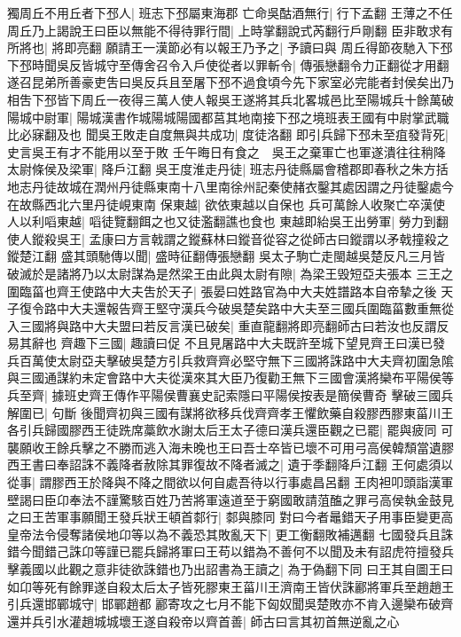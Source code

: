 獨周丘不用丘者下邳人|{
	班志下邳屬東海郡}
亡命吳酤酒無行|{
	行下孟翻}
王薄之不任周丘乃上謁說王曰臣以無能不得待罪行間|{
	上時掌翻說式芮翻行戶剛翻}
臣非敢求有所將也|{
	將即亮翻}
願請王一漢節必有以報王乃予之|{
	予讀曰與}
周丘得節夜馳入下邳下邳時聞吳反皆城守至傳舍召令入戶使從者以罪斬令|{
	傳張戀翻令力正翻從才用翻}
遂召昆弟所善豪吏吿曰吳反兵且至屠下邳不過食頃今先下家室必完能者封侯矣出乃相吿下邳皆下周丘一夜得三萬人使人報吳王遂將其兵北畧城邑比至陽城兵十餘萬破陽城中尉軍|{
	陽城漢書作城陽城陽國都莒其地南接下邳之境班表王國有中尉掌武職比必寐翻及也}
聞吳王敗走自度無與共成功|{
	度徒洛翻}
即引兵歸下邳未至疽發背死|{
	史言吳王有才不能用以至于敗}
壬午晦日有食之　吳王之棄軍亡也軍遂潰往往稍降太尉條侯及梁軍|{
	降戶江翻}
吳王度淮走丹徒|{
	班志丹徒縣屬會稽郡即春秋之朱方括地志丹徒故城在潤州丹徒縣東南十八里南徐州記秦使赭衣鑿其處因謂之丹徒鑿處今在故縣西北六里丹徒峴東南}
保東越|{
	欲依東越以自保也}
兵可萬餘人收聚亡卒漢使人以利㗖東越|{
	㗖徒覽翻餌之也又徒濫翻譙也食也}
東越即紿吳王出勞軍|{
	勞力到翻}
使人鏦殺吳王|{
	孟康曰方言戟謂之鏦蘇林曰鏦音從容之從師古曰鏦謂以矛戟撞殺之鏦楚江翻}
盛其頭馳傳以聞|{
	盛時征翻傳張戀翻}
吳太子駒亡走閩越吳楚反凡三月皆破滅於是諸將乃以太尉謀為是然梁王由此與太尉有隙|{
	為梁王毁短亞夫張本}
三王之圍臨菑也齊王使路中大夫吿於天子|{
	張晏曰姓路官為中大夫姓譜路本自帝摯之後}
天子復令路中大夫還報告齊王堅守漢兵今破吳楚矣路中大夫至三國兵圍臨菑數重無從入三國將與路中大夫盟曰若反言漢已破矣|{
	重直龍翻將即亮翻師古曰若汝也反謂反易其辭也}
齊趣下三國|{
	趣讀曰促}
不且見屠路中大夫既許至城下望見齊王曰漢已發兵百萬使太尉亞夫擊破吳楚方引兵救齊齊必堅守無下三國將誅路中大夫齊初圍急隂與三國通謀約未定會路中大夫從漢來其大臣乃復勸王無下三國會漢將欒布平陽侯等兵至齊|{
	據班史齊王傳作平陽侯曹襄史記索隱曰平陽侯按表是簡侯曹奇}
擊破三國兵解圍已|{
	句斷}
後聞齊初與三國有謀將欲移兵伐齊齊孝王懼飲藥自殺膠西膠東菑川王各引兵歸國膠西王徒跣席藁飲水謝太后王太子德曰漢兵還臣觀之已罷|{
	罷與疲同}
可襲願收王餘兵擊之不勝而逃入海未晚也王曰吾士卒皆已壞不可用弓高侯韓頹當遺膠西王書曰奉詔誅不義降者赦除其罪復故不降者滅之|{
	遺于季翻降戶江翻}
王何處須以從事|{
	謂膠西王於降與不降之間欲以何自處吾待以行事處昌呂翻}
王肉袒叩頭詣漢軍壁謁曰臣卬奉法不謹驚駭百姓乃苦將軍遠道至于窮國敢請菹醢之罪弓高侯執金鼓見之曰王苦軍事願聞王發兵狀王頓首䣛行|{
	䣛與膝同}
對曰今者鼂錯天子用事臣變更高皇帝法令侵奪諸侯地卬等以為不義恐其敗亂天下|{
	更工衡翻敗補邁翻}
七國發兵且誅錯今聞錯己誅卬等謹已罷兵歸將軍曰王苟以錯為不善何不以聞及未有詔虎符擅發兵擊義國以此觀之意非徒欲誅錯也乃出詔書為王讀之|{
	為于偽翻下同}
曰王其自圖王曰如卬等死有餘罪遂自殺太后太子皆死膠東王菑川王濟南王皆伏誅酈將軍兵至趙趙王引兵還邯鄲城守|{
	邯鄲趙都}
酈寄攻之七月不能下匈奴聞吳楚敗亦不肯入邊欒布破齊還并兵引水灌趙城城壞王遂自殺帝以齊首善|{
	師古曰言其初首無逆亂之心}
